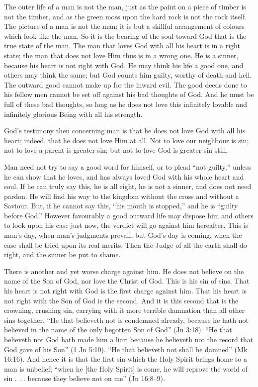 \documentclass[
]{book}
\begin{document}
The outer life of a man is not the man, just as the paint on a piece of timber is not the timber, and as the green moss upon the hard rock is not the rock itself. The picture of a man is not the man; it is but a skillful arrangement of colours which look like the man. So it is the bearing of the soul toward God that is the true state of the man. The man that loves God with all his heart is in a right state; the man that does not love Him thus is in a wrong one. He is a sinner, because his heart is not right with God. He may think his life a good one, and others may think the same; but God counts him guilty, worthy of death and hell. The outward good cannot make up for the inward evil. The good deeds done to his fellow men cannot be set off against his bad thoughts of God. And he must be full of these bad thoughts, so long as he does not love this infinitely lovable and infinitely glorious Being with all his strength.

God's testimony then concerning man is that he does not love God with all his heart; indeed, that he does not love Him at all. Not to love our neighbour is sin; not to love a parent is greater sin; but not to love God is greater sin still.

Man need not try to say a good word for himself, or to plead ``not guilty,'' unless he can show that he loves, and has always loved God with his whole heart and soul. If he can truly say this, he is all right, he is not a sinner, and does not need pardon. He will find his way to the kingdom without the cross and without a Saviour. But, if he cannot say this, ``his mouth is stopped,'' and he is ``guilty before God.'' However favourably a good outward life may dispose him and others to look upon his case just now, the verdict will go against him hereafter. This is man's day, when man's judgments prevail; but God's day is coming, when the case shall be tried upon its real merits. Then the Judge of all the earth shall do right, and the sinner be put to shame.

There is another and yet worse charge against him. He does not believe on the name of the Son of God, nor love the Christ of God. This is his sin of sins. That his heart is not right with God is the first charge against him. That his heart is not right with the Son of God is the second. And it is this second that is the crowning, crushing sin, carrying with it more terrible damnation than all other sins together. ``He that believeth not is condemned already, because he hath not believed in the name of the only begotten Son of God'' (Jn 3:18). ``He that believeth not God hath made him a liar; because he believeth not the record that God gave of his Son'' (1 Jn 5:10). ``He that believeth not shall be damned'' (Mk 16:16). And hence it is that the first sin which the Holy Spirit brings home to a man is unbelief; ``when he {[}the Holy Spirit{]} is come, he will reprove the world of sin . . . because they believe not on me'' (Jn 16:8--9).
\end{document}
